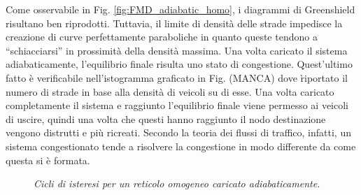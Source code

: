 \documentclass[../main.tex]{subfiles}
\begin{document}
Come osservabile in Fig. \ref{fig:FMD_adiabatic_homo}, i diagrammi di Greenshield risultano ben riprodotti.
Tuttavia, il limite di densit\`a delle strade impedisce la creazione di curve perfettamente paraboliche in quanto queste tendono a ``schiacciarsi'' in prossimit\`a della densit\`a massima.
Una volta caricato il sistema adiabaticamente, l'equilibrio finale risulta uno stato di congestione.
Quest'ultimo fatto \`e verificabile nell'istogramma graficato in Fig. (MANCA) dove \` riportato il numero di strade in base alla densit\`a di veicoli su di esse.
Una volta caricato completamente il sistema e raggiunto l'equilibrio finale viene permesso ai veicoli di uscire, quindi una volta che questi hanno raggiunto il nodo destinazione vengono distrutti e pi\`u ricreati.
Secondo la teoria dei flussi di traffico, infatti, un sistema congestionato tende a risolvere la congestione in modo differente da come questa si \`e formata.
\begin{figure}[H]
    \hfill
    \caption[Isteresi con carico adiabatico e reticolo omogeneo]{\emph{Cicli di isteresi per un reticolo omogeneo caricato adiabaticamente.}}
    \label{fig:hysteresys_adiabatic_homo}
\end{figure}
\end{document}
